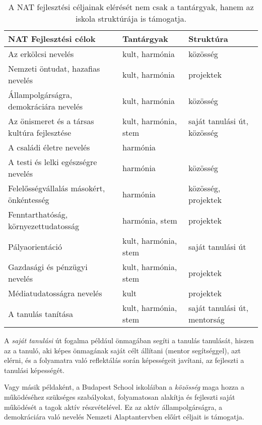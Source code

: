 \begin{table}

  \begin{tabular}{p{5cm}|>{\raggedright}p{3cm}|p{3cm}}


    \textbf{NAT Fejlesztési célok} & \textbf{Tantárgyak} & \textbf{Struktúra}\\ \hline
Az erkölcsi nevelés & kult, harmónia & közösség\\ \hline
Nemzeti öntudat, hazafias nevelés & kult, harmónia & projektek\\ \hline
Állampolgárságra, demokráciára nevelés & kult, harmónia & közösség\\ \hline
Az önismeret és a társas kultúra fejlesztése & kult, harmónia, stem & saját tanulási út, közösség\\ \hline
A családi életre nevelés & harmónia &  \\ \hline
A testi és lelki egészségre nevelés & harmónia & közösség\\ \hline
Felelősségvállalás másokért, önkéntesség & harmónia & közösség, projektek\\ \hline
Fenntarthatóság, környezettudatosság & harmónia, stem & projektek\\ \hline
Pályaorientáció & kult, harmónia, stem & saját tanulási út\\ \hline
Gazdasági és pénzügyi nevelés & kult, harmónia, stem & projektek\\ \hline
Médiatudatosságra nevelés & kult & projektek\\ \hline
A tanulás tanítása & kult, harmónia, stem & saját tanulási út, mentorság\\

  \end{tabular}
  \caption{A NAT fejlesztési céljainak elérését nem csak a tantárgyak, hanem az iskola struktúrája is támogatja.}
  \label{tbl:nat_fejlesztesi}
\end{table}


A \emph{saját tanulási} út fogalma például önmagában segíti a tanulás tanulását, hiszen az a tanuló, aki képes önmagának saját célt állítani (mentor segítséggel), azt elérni, és a folyamatra való reflektálás során képességeit javítani, az fejleszti a tanulási képességét.

Vagy másik példaként, a Budapest School iskoláiban a \emph{közösség} maga hozza a működéséhez szükséges szabályokat, folyamatosan alakítja és fejleszti saját működését a tagok aktív részvételével. Ez az aktív állampolgárságra, a demokráciára való nevelés Nemzeti Alaptantervben előírt céljait is támogatja.

